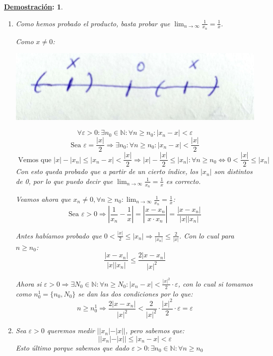 \documentclass[10pt,a4paper,openright]{book}
\theoremstyle{break}
\newtheorem*{demo}{\underline{Demostración}:}
\begin{document}
\begin{demo}
\begin{enumerate}
\item Como hemos probado el producto, basta probar que $\lim_{n\rightarrow \infty} \frac{1}{x_n}=\frac{1}{x}$.\par
Como $x\neq 0$:

\begin{center}
\includegraphics[scale=0.05]{x a cero}
\end{center}

$$\forall \varepsilon>0: \exists n_0\in \mathbb N: \forall n\geq n_0: |x_n-x|<\varepsilon$$
$$\mbox{Sea }\varepsilon=\frac{|x|}{2}\Rightarrow \exists n_0: \forall n\geq n_0: |x_n-x|<\frac{|x|}{2}$$
$$\mbox{ Vemos que } |x|-|x_n|\leq |x_n-x|<\frac{|x|}{2}\Rightarrow |x|-\frac{|x|}{2}\leq |x_n|: \forall n\geq n_0\Leftrightarrow 0< \frac{|x|}{2}\leq |x_n|$$
Con esto queda probado que a partir de un cierto índice, los $|x_n|$ son distintos de 0, por lo que puedo decir que $\lim_{n\rightarrow \infty} \frac{1}{x_n}=\frac{1}{x}$ es correcto.\par

Veamos ahora que $x_n\neq 0, \forall n\geq n_0: \lim_{n\rightarrow \infty}\frac{1}{x_n}=\frac{1}{x}$:
$$\mbox{Sea }\varepsilon>0\Rightarrow |\frac{1}{x_n}-\frac{1}{x}|=|\frac{x-x_n}{x\cdot x_n}|=\frac{|x-x_n|}{|x||x_n|}$$

Antes habíamos probado que $0< \frac{|x|}{2}\leq |x_n|\Rightarrow \frac{1}{|x_n|}\leq \frac{2}{|x|}$. Con lo cual para $n\geq n_0$:
$$\frac{|x-x_n|}{|x||x_n|}\leq \frac{2|x-x_n|}{|x|^2}$$

Ahora si $\varepsilon>0\Rightarrow \exists N_0\in \mathbb N: \forall n\geq N_0: |x_n-x|< \frac{|x|^2}{2}\cdot \varepsilon$, con lo cual si tomamos como $n_0^1=\{n_0,N_0\}$ se dan las dos condiciones por lo que:
	$$n\geq n_0^1\Rightarrow \frac{2|x-x_n|}{|x|^2}< \frac{2}{|x|^2}\cdot \frac{|x|^2}{2}\cdot \varepsilon=\varepsilon$$

\vspace{0.40cm}

\item Sea $\varepsilon>0$ queremos medir $||x_n|-|x||$, pero sabemos que:
$$||x_n|-|x||\leq |x_n-x|<\varepsilon$$
Esto último porque sabemos que dado $\varepsilon>0 : \exists n_0\in \mathbb N: \forall n\geq n_0$
\end{enumerate}
\end{demo}
\end{document}
